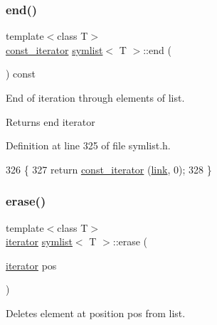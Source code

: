 \subsubsection{\texorpdfstring{end()}{end()}\hspace{0.1cm}{\footnotesize\ttfamily [2/2]}}
{\footnotesize\ttfamily template$<$class T$>$ \\
\mbox{\hyperlink{classsymlist_af15c0ca931299054f83d17a1580a5159}{const\+\_\+iterator}} \mbox{\hyperlink{classsymlist}{symlist}}$<$ T $>$\+::end (\begin{DoxyParamCaption}{ }\end{DoxyParamCaption}) const\hspace{0.3cm}{\ttfamily [inline]}}



End of iteration through elements of list. 

\begin{DoxyReturn}{Returns}
end iterator 
\end{DoxyReturn}


Definition at line 325 of file symlist.\+h.


\begin{DoxyCode}
326     \{
327     \textcolor{keywordflow}{return} \mbox{\hyperlink{classsymlist_af15c0ca931299054f83d17a1580a5159}{const\_iterator}} (\mbox{\hyperlink{classsymlist_a8fa81a7f6d0bb986bb593776db582c90}{link}}, 0);
328     \}
\end{DoxyCode}
\mbox{\label{classsymlist_a75fc1fc7db7b20cc430ddb8577608904}} 
\subsubsection{\texorpdfstring{erase()}{erase()}\hspace{0.1cm}{\footnotesize\ttfamily [1/2]}}
{\footnotesize\ttfamily template$<$class T$>$ \\
\mbox{\hyperlink{classsymlist_a66045fbe3d98975e5537092ede8b50df}{iterator}} \mbox{\hyperlink{classsymlist}{symlist}}$<$ T $>$\+::erase (\begin{DoxyParamCaption}\item[{\mbox{\hyperlink{classsymlist_a66045fbe3d98975e5537092ede8b50df}{iterator}}}]{pos }\end{DoxyParamCaption})}



Deletes element at position {\ttfamily pos} from list. 



